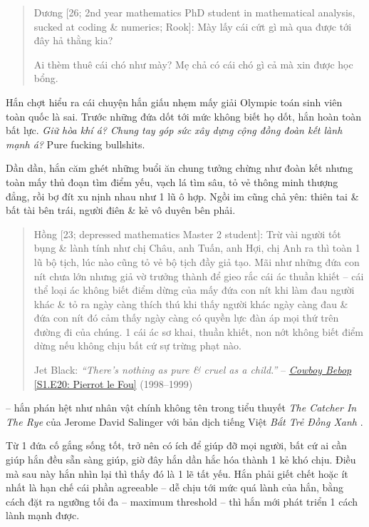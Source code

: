 \documentclass[12pt,twoside]{book}
\begin{document}
\begin{quote}
	{\sf Dương [26; 2nd year mathematics PhD student in mathematical analysis, sucked at coding \& numerics; Rook]}: Mày lấy cái cứt gì mà qua được tới đây hả thằng kia?
	
	Ai thèm thuê cái chó như mày? Mẹ chả có cái chó gì cả mà xin được học bổng.
\end{quote}
Hắn chợt hiểu ra cái chuyện hắn giấu nhẹm mấy giải Olympic toán sinh viên toàn quốc là sai. Trước những đứa dốt tới mức không biết họ dốt, hắn hoàn toàn bất lực. {\it Giữ hòa khí á? Chung tay góp sức xây dựng cộng đồng đoàn kết lành mạnh á?} Pure fucking bullshits.

Dần dần, hắn căm ghét những buổi ăn chung tưởng chừng như đoàn kết nhưng toàn mấy thủ đoạn tìm điểm yếu, vạch lá tìm sâu, tỏ vẻ thông minh thượng đẳng, rồi bợ đít xu nịnh nhau như 1 lũ ô hợp. Ngồi im cũng chả yên: thiên tai \& bất tài bên trái, người điên \& kẻ vô duyên bên phải.
\begin{quote}
	{\sf Hồng [23; depressed mathematics Master 2 student]}: Trừ vài người tốt bụng \& lành tính như chị Châu, anh Tuấn, anh Hợi, chị Anh ra thì toàn 1 lũ bộ tịch, lúc nào cũng tỏ vẻ bộ tịch đầy giả tạo. Mãi như những đứa con nít chưa lớn nhưng giả vờ trưởng thành để gieo rắc cái ác thuần khiết -- cái thể loại ác không biết điểm dừng của mấy đứa con nít khi làm đau người khác \& tỏ ra ngày càng thích thú khi thấy người khác ngày càng đau \& đứa con nít đó cảm thấy ngày càng có quyền lực đàn áp mọi thứ trên đường đi của chúng. 1 cái ác sơ khai, thuần khiết, non nớt không biết điểm dừng nếu không chịu bất cứ sự trừng phạt nào.
	
	{\sf Jet Black}: {\it``There's nothing as pure \& cruel as a child.''} -- \href{https://www.imdb.com/title/tt0618976}{{\it Cowboy Bebop} [S1.E20: Pierrot le Fou]} (1998--1999)
\end{quote}
-- hắn phán hệt như nhân vật chính không tên trong tiểu thuyết {\it The Catcher In The Rye} \cite{Salinger_catcher_in_rye} của {\sc Jerome David Salinger} với bản dịch tiếng Việt {\it Bắt Trẻ Đồng Xanh} \cite{Salinger_btdx}.

Từ 1 đứa cố gắng sống tốt, trở nên có ích để giúp đỡ mọi người, bất cứ ai cần giúp hắn đều sẵn sàng giúp, giờ đây hắn dần hắc hóa thành 1 kẻ khó chịu. Điều mà sau này hắn nhìn lại thì thấy đó là 1 lẽ tất yếu. Hắn phải giết chết hoặc ít nhất là hạn chế cái phần agreeable -- dễ chịu tới mức quá lành của hắn, bằng cách đặt ra ngưỡng tối đa -- maximum threshold -- thì hắn mới phát triển 1 cách lành mạnh được.
\end{document}
